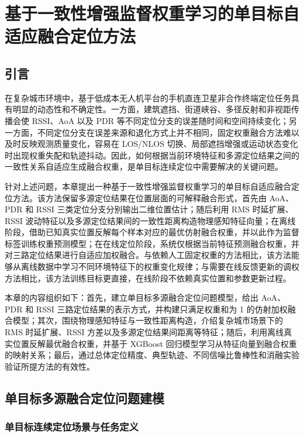 \chapter{基于一致性增强监督权重学习的单目标自适应融合定位方法}
\label{ch:single_target_fusion}

\section{引言}
\label{sec:3_intro}

在复杂城市环境中，基于低成本无人机平台的手机直连卫星非合作终端定位任务具有明显的动态性和不确定性。一方面，建筑遮挡、街道峡谷、多径反射和非视距传播会使 RSSI、AoA 以及 PDR 等不同定位分支的误差随时间和空间持续变化；另一方面，不同定位分支在误差来源和退化方式上并不相同，固定权重融合方法难以及时反映观测质量变化，容易在 LOS/NLOS 切换、局部遮挡增强或运动状态变化时出现权重失配和轨迹抖动。因此，如何根据当前环境特征和多源定位结果之间的一致性关系自适应生成融合权重，是单目标连续定位中需要解决的关键问题。

针对上述问题，本章提出一种基于一致性增强监督权重学习的单目标自适应融合定位方法。该方法保留多源定位结果在位置层面的可解释融合形式，首先由 AoA、PDR 和 RSSI 三类定位分支分别输出二维位置估计；随后利用 RMS 时延扩展、RSSI 波动特征以及多源定位结果间的一致性距离构造物理感知特征向量；在离线阶段，借助已知真实位置反解每个样本对应的最优仿射融合权重，并以此作为监督标签训练权重预测模型；在在线定位阶段，系统仅根据当前特征预测融合权重，并对三路定位结果进行自适应加权融合。与依赖人工固定权重的方法相比，该方法能够从离线数据中学习不同环境特征下的权重变化规律；与需要在线反馈更新的调权方法相比，该方法训练目标更直接，在线阶段不依赖真实位置和参数更新过程。

本章的内容组织如下：首先，建立单目标多源融合定位问题模型，给出 AoA、PDR 和 RSSI 三路定位结果的表示方式，并构建只满足权重和为 1 的仿射加权融合模型；其次，围绕物理感知特征与一致性距离构造，介绍复杂城市场景下的 RMS 时延扩展、RSSI 方差以及多源定位结果间距离等特征；随后，利用离线真实位置反解最优融合权重，并基于 XGBoost 回归模型学习从特征向量到融合权重的映射关系；最后，通过总体定位精度、典型轨迹、不同信噪比鲁棒性和消融实验验证所提方法的有效性。

\section{单目标多源融合定位问题建模}
\label{sec:3_1}

\subsection{单目标连续定位场景与任务定义}
\label{subsec:3_1_1}

